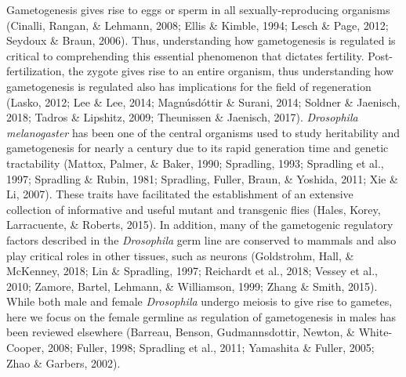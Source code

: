 \documentclass[12pt,twoside]{reedthesis}
\begin{document}
Gametogenesis gives rise to eggs or sperm in all sexually-reproducing
organisms (Cinalli, Rangan, \& Lehmann, 2008; Ellis \& Kimble, 1994; Lesch \& Page, 2012; Seydoux \& Braun, 2006).
Thus, understanding how gametogenesis is regulated is critical to
comprehending this essential phenomenon that dictates fertility.
Post-fertilization, the zygote gives rise to an entire organism, thus
understanding how gametogenesis is regulated also has implications for
the field of regeneration (Lasko, 2012; Lee \& Lee, 2014; Magnúsdóttir \& Surani, 2014; Soldner \& Jaenisch, 2018; Tadros \& Lipshitz, 2009; Theunissen \& Jaenisch, 2017).
\emph{Drosophila melanogaster} has been one of the central organisms used to
study heritability and gametogenesis for nearly a century due to its
rapid generation time and genetic tractability (Mattox, Palmer, \& Baker, 1990; Spradling, 1993; Spradling et al., 1997; Spradling \& Rubin, 1981; Spradling, Fuller, Braun, \& Yoshida, 2011; Xie \& Li, 2007). These traits have facilitated the establishment of an
extensive collection of informative and useful mutant and transgenic
flies (Hales, Korey, Larracuente, \& Roberts, 2015). In addition, many of the gametogenic regulatory
factors described in the \emph{Drosophila} germ line are conserved to mammals
and also play critical roles in other tissues, such as neurons
(Goldstrohm, Hall, \& McKenney, 2018; Lin \& Spradling, 1997; Reichardt et al., 2018; Vessey et al., 2010; Zamore, Bartel, Lehmann, \& Williamson, 1999; Zhang \& Smith, 2015). While both male and female \emph{Drosophila}
undergo meiosis to give rise to gametes, here we focus on the female
germline as regulation of gametogenesis in males has been reviewed
elsewhere (Barreau, Benson, Gudmannsdottir, Newton, \& White-Cooper, 2008; Fuller, 1998; Spradling et al., 2011; Yamashita \& Fuller, 2005; Zhao \& Garbers, 2002).
\end{document}
